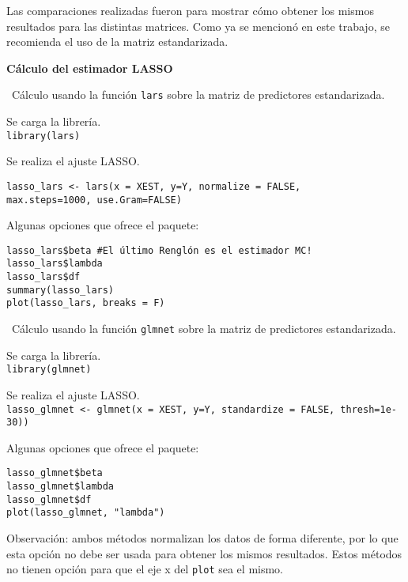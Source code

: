 \documentclass[a4paper,12pt]{report}
\begin{document}
\vspace{1cm}
Las comparaciones realizadas fueron para mostrar cómo obtener los mismos resultados para las distintas matrices. Como ya se mencionó en este trabajo, se recomienda el uso de la matriz estandarizada.

{\large\textbf{Cálculo del estimador LASSO}}

\textbullet\ Cálculo usando la función \texttt{lars} sobre la matriz de predictores estandarizada.
\vspace{0.4cm}

Se carga la librería.\\
\texttt{library(lars)}

\vspace{0.3cm}

Se realiza el ajuste LASSO.
{
\begin{verbatim}
lasso_lars <- lars(x = XEST, y=Y, normalize = FALSE, 
max.steps=1000, use.Gram=FALSE)
\end{verbatim}
}

Algunas opciones que ofrece el paquete:
{
\begin{verbatim}
lasso_lars$beta #El último Renglón es el estimador MC!
lasso_lars$lambda
lasso_lars$df
summary(lasso_lars)
plot(lasso_lars, breaks = F)
\end{verbatim}
}

\textbullet\ Cálculo usando la función \texttt{glmnet} sobre la matriz de predictores estandarizada.
\vspace{0.4cm}

Se carga la librería.\\
\texttt{library(glmnet)}

Se realiza el ajuste LASSO.\\
\texttt{lasso\_glmnet <- glmnet(x = XEST, y=Y, standardize = FALSE, thresh=1e-30))}

\vspace{0.3cm}

Algunas opciones que ofrece el paquete:
{
\begin{verbatim}
lasso_glmnet$beta
lasso_glmnet$lambda
lasso_glmnet$df
plot(lasso_glmnet, "lambda")
\end{verbatim}
}

Observación: ambos métodos normalizan los datos de forma diferente, por lo que esta opción no debe ser usada para obtener los mismos resultados. Estos métodos no tienen opción para que el eje x del \texttt{plot} sea el mismo.
\end{document}
